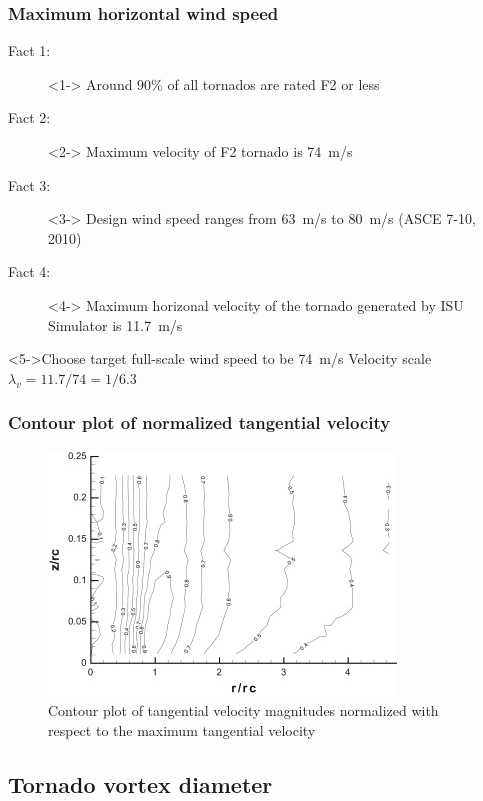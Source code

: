 \documentclass{beamer}
\begin{document}
\begin{frame}
	\frametitle{Maximum horizontal wind speed}
	\begin{description}
		\item[Fact 1:  ]<1-> Around 90\% of all tornados are rated F2 or less
		\item[Fact 2: ]<2-> Maximum velocity of F2 tornado is \alert{\SI{74}{m/s}}
		\item[Fact 3: ]<3-> Design wind speed ranges from \alert{\SI{63}{m/s}} to \alert{\SI{80}{m/s}} (ASCE 7-10, 2010)
		\item[Fact 4: ]<4-> Maximum horizonal velocity of the tornado generated by ISU Simulator is \alert{\SI{11.7}{m/s}}
	\end{description}
	\begin{block}<5->{Choose target full-scale wind speed to be \alert{\SI{74}{m/s}}}
			 Velocity scale $\lambda_v=11.7/74=1/6.3$
	\end{block} 
\end{frame}

\begin{frame}
	\frametitle{Contour plot of normalized tangential velocity}
	\begin{figure}
	\centering
	\caption{Contour plot of tangential velocity magnitudes normalized with respect to the maximum tangential velocity}
	\includegraphics{./fig/1.jpg}
	\end{figure}

\end{frame}

\subsection{Tornado vortex diameter}
\end{document}
